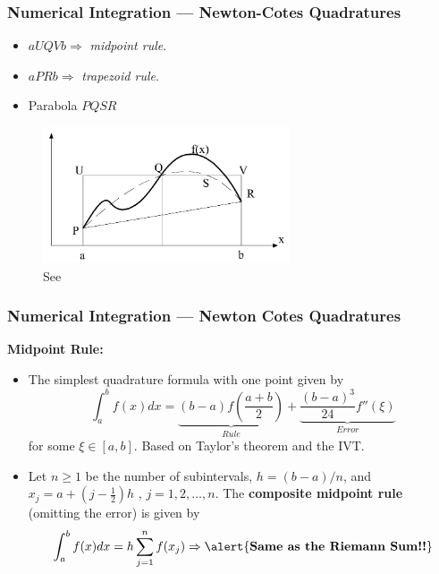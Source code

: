 \documentclass[11pt,xcolor={svgnames},aspectratio=169,usepdftitle=false,notheorems]{beamer}
\begin{document}
\begin{frame}
  \frametitle{Numerical Integration --- Newton-Cotes Quadratures}
  \begin{minipage}{0.3\textwidth}
  \begin{itemize}
    \item $aUQVb\Rightarrow$ \textit{midpoint rule}.
    \item $aPRb\Rightarrow$ \textit{trapezoid rule}.
    \item Parabola $PQSR$
  \end{itemize}
\end{minipage}
\begin{minipage}{0.69\textwidth}
  \begin{figure}
    \centering
    \includegraphics[width = 0.65\textwidth]{../figures/judd_newton_cotes.png}
    \caption{See \cite{judd1998numerical}}
  \end{figure}
\end{minipage}
\end{frame}

\begin{frame}
  \frametitle{Numerical Integration --- Newton Cotes Quadratures}
\alert{\textbf{Midpoint Rule:}}
\begin{itemize}
  \item The simplest quadrature formula with one point given by
  \[
  \int^b_a f(x)dx = \underset{Rule}{\underbrace{(b-a)f\left(\frac{a+b}{2}\right)}} + \underset{Error}{\underbrace{\frac{(b-a)^3}{24}f''(\xi)}}
  \]
  for some $\xi\in [a,b]$. Based on Taylor's theorem and the IVT.
  \item Let $n\geq 1$ be the number of subintervals, $h = (b -a) / n$, and $x_j = a + (j - \frac{1}{2})h$ , $j=1,2,\ldots,n$. The \alert{\textbf{composite midpoint rule}} {\tiny (omitting the error)} is given by
  \[
  \int^b_a f(x)dx = h\sum^n_{j=1}f(x_j) \Rightarrow \text{\alert{\textbf{Same as the Riemann Sum!!}}}
  \]
\end{itemize}
\end{frame}
\end{document}
